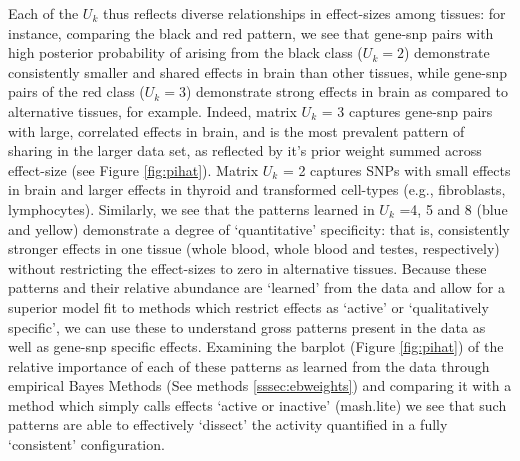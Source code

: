 Each of the $U_{k}$ thus reflects diverse relationships in effect-sizes among tissues: for instance, comparing the black and red pattern, we see that gene-snp pairs with high posterior probability of arising from the black class ($U_{k}=2$) demonstrate consistently smaller and shared effects in brain than other tissues, while gene-snp pairs of the red class ($U_{k}=3$) demonstrate strong effects in brain as compared to alternative tissues, for example. Indeed, matrix $U_{k}$ = 3 captures gene-snp pairs with large, correlated effects in brain, and is the most prevalent pattern of sharing in the larger data set, as reflected by it's prior weight summed across effect-size (see Figure \ref{fig:pihat}). Matrix $U_{k}$ = 2 captures SNPs with small effects in brain and larger effects in thyroid and transformed cell-types (e.g., fibroblasts, lymphocytes).
Similarly, we see that the patterns learned in $U_{k}$ =4, 5 and 8 (blue and yellow) demonstrate a degree of `quantitative' specificity: that is, consistently stronger effects in one tissue (whole blood, whole blood and testes, respectively) without restricting the effect-sizes to zero in alternative tissues. Because these patterns and their relative abundance are `learned' from the data and allow for a superior model fit to methods which restrict effects as `active' or `qualitatively specific', we can use these to understand gross patterns present in the data as well as gene-snp specific effects. Examining the barplot (Figure \ref{fig:pihat}) of the relative importance of each of these patterns as learned from the data through empirical Bayes Methods (See methods \ref{sssec:ebweights}) and comparing it with a method which simply calls effects `active or inactive' (mash.lite) we see that such patterns are able to effectively `dissect' the activity quantified in a fully `consistent' configuration.

%



